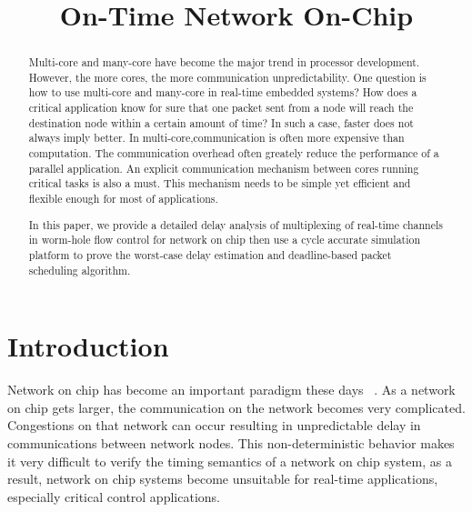 \documentclass[conference, twocolumn]{IEEEtran}
\theoremstyle{definition}
\begin{document}
\title{On-Time Network On-Chip}


\maketitle

\begin{abstract}
Multi-core and many-core have become the major trend in processor development.
However, the more cores, the more communication unpredictability. One
question is how to use multi-core and many-core in real-time embedded systems?
How does a critical application know for sure that one packet sent from a node
will reach the destination node within a certain amount of time? In such a
case, faster does not always imply better. In multi-core,communication is
often more expensive than computation. The communication overhead often
greately reduce the performance of a parallel application. An explicit
communication mechanism between cores running critical tasks is also a must.
This mechanism needs to be simple yet efficient and flexible enough for most of
applications.

In this paper, we provide a detailed delay analysis of multiplexing of real-time
channels in worm-hole flow control for network on chip then use a cycle
accurate simulation platform to prove the worst-case delay estimation and
deadline-based packet scheduling algorithm.

\end{abstract}

\section{Introduction}
Network on chip has become an important paradigm these days
~\cite{DallyPacketNotWire}. As a network on chip gets larger, the communication
on the network becomes very complicated. Congestions on that network can occur
resulting in unpredictable delay in communications between network nodes. This non-deterministic behavior 
makes it very difficult to verify the timing semantics of a network on chip 
system, as a result, network on chip systems become unsuitable for real-time 
applications, especially critical control applications.
\end{document}
